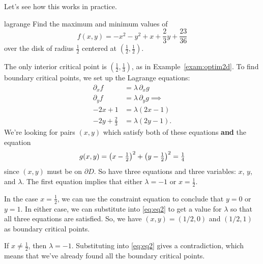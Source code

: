 \documentclass{watsonbook}
\begin{document}
  Let's see how this works in practice.

  \begin{example}{}{lagrange}
    Find the maximum and minimum values of
    \[f(x,y) = -x^2 - y^2 + x + \frac{2}{3} y + \frac{23}{36}\]
    over the disk of radius $\tfrac{1}{2}$ centered at $\left(
      \tfrac{1}{2}, \tfrac{1}{2}\right)$. 
  \end{example}

  \begin{solution}
    The only interior critical point is
    $\left(\tfrac{1}{2},\tfrac{1}{3}\right)$, as in
    Example~\ref{exam:optim2d}. To find boundary critical points, we
    set up the Lagrange equations:
    \begin{align} \nonumber
      \partial_x f &= \lambda \, \partial_x g \\ \nonumber
      \partial_y f &= \lambda \, \partial_y g \implies \\ 
      -2x + 1 &= \lambda(2x - 1)  \\ \label{eq:eq2}
      -2y + \tfrac{2}{3} &= \lambda(2y-1). 
    \end{align}
    We're looking for pairs $(x,y)$ which satisfy both of these
    equations \textbf{and} the equation
    \begin{equation} 
          g(x,y) = \left(x-\tfrac{1}{2}\right)^2 +
          \left(y-\tfrac{1}{2}\right)^2 = \tfrac{1}{4} \\ 
    \end{equation}
    since
    $(x,y)$ must be on $\partial D$. So have three equations and three
    variables: $x$, $y$, and $\lambda$. The first equation implies
    that either $\lambda = -1$ or $x = \tfrac{1}{2}$.

    In the case $x = \frac{1}{2}$, we can use the constraint equation
    to conclude that $y = 0$ or $y = 1$. In either case, we can
    substitute into \eqref{eq:eq2} to get a value for $\lambda$ so
    that all three equations are satisfied. So, we have
    $(x,y) = (1/2, 0)$ and $(1/2,1)$ as boundary critical points.

    If $x \neq \tfrac{1}{2}$, then $\lambda = -1$. Substituting into
    \eqref{eq:eq2} gives a contradiction, which means that we've
    already found all the boundary critical points.


\end{solution}
\end{document}
